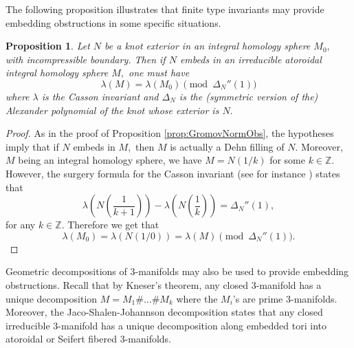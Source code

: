 \documentclass[12pt]{amsart}
\newtheorem{prop}[thm]{Proposition}
\theoremstyle{definition}
\newcommand{\Z}{\mathbb{Z}}
\begin{document}
The following proposition illustrates that finite type invariants may provide embedding obstructions in some specific situations.
\begin{prop}
	\label{prop:CassonObs} Let $N$ be a knot exterior in an integral homology sphere $M_0,$ with incompressible boundary. Then if $N$ embeds in an irreducible atoroidal integral homology sphere $M,$ one must have 
\[	\lambda(M)=\lambda(M_0) \pmod {\Delta_N''(1)}\]
	where $\lambda$ is the Casson invariant and $\Delta_N$ is the (symmetric version of the) Alexander polynomial of the knot whose exterior is $N.$
\end{prop}
\begin{proof}
	As in the proof of Proposition \ref{prop:GromovNormObs}, the hypotheses imply that if $N$ embeds in $M,$ then $M$ is actually a Dehn filling of $N.$ Moreover, $M$ being an integral homology sphere, we have $M=N(1/k)$ for some $k\in \Z.$ However, the surgery formula for the Casson invariant (see for instance \cite[Lecture 12]{Saveliev}) states that
	$$\lambda\left(N\left(\frac{1}{k+1}\right)\right)-\lambda\left(N\left(\frac{1}{k}\right)\right)=\Delta_N''(1),$$
	for any $k\in \Z.$ Therefore we get that 
	$$\lambda(M_0)=\lambda(N(1/0))=\lambda(M) \pmod {\Delta_N''(1)}.$$
\end{proof}

Geometric decompositions of $3$-manifolds may also be used to provide embedding obstructions. Recall that by Kneser's theorem, any closed $3$-manifold has a unique decomposition $M=M_1\#\ldots \# M_k$ where the $M_i$'s are prime $3$-manifolds. Moreover, the Jaco-Shalen-Johannson decomposition \cite{JS,J} states that any closed irreducible $3$-manifold has a unique decomposition along embedded tori into atoroidal or Seifert fibered $3$-manifolds.
\end{document}
